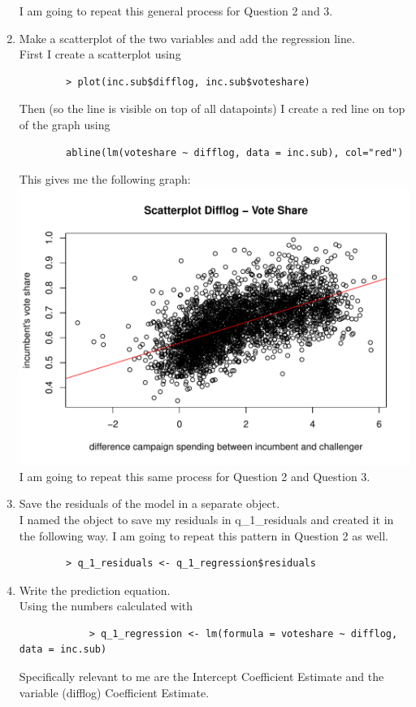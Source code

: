 \documentclass[12pt,letterpaper]{article}
\begin{document}
\begin{enumerate}
	I am going to repeat this general process for Question 2 and 3.
		\item Make a scatterplot of the two variables and add the regression line. 	\\
		
		First I create a scatterplot using 
		\begin{verbatim}
		> plot(inc.sub$difflog, inc.sub$voteshare)
	\end{verbatim}
	Then (so the line is visible on top of all datapoints) I create a red line on top of the graph using
	\begin{verbatim}
		abline(lm(voteshare ~ difflog, data = inc.sub), col="red")
	\end{verbatim}
	This gives me the following graph: \\
 \includegraphics[width=\textwidth,height=\textheight,keepaspectratio]{Q_1_Plot}
 I am going to repeat this same process for Question 2 and Question 3.
	
		\item Save the residuals of the model in a separate object.	\\
		
		I named the object to save my residuals in q\_1\_residuals and created it in the following way. I am going to repeat this pattern in Question 2 as well.
		\begin{verbatim}
		> q_1_residuals <- q_1_regression$residuals
	\end{verbatim}
		\item Write the prediction equation. \\
		
		Using the numbers calculated with
			\begin{verbatim}
			> q_1_regression <- lm(formula = voteshare ~ difflog, data = inc.sub)
		\end{verbatim}
		Specifically relevant to me are the Intercept Coefficient Estimate and the variable (difflog) Coefficient Estimate.
		

\end{enumerate}
\end{document}
